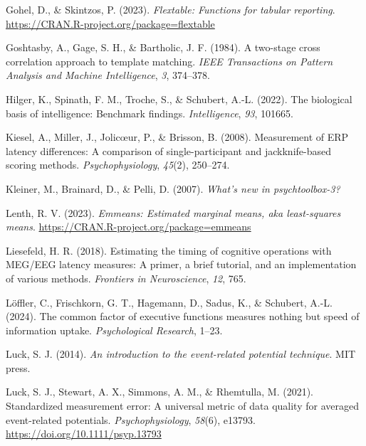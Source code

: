 \documentclass[
  man]{apa7}
\newlength{\cslhangindent}
\newlength{\cslentryspacingunit} %
\newenvironment{CSLReferences}[2] %
 {%
  \setlength{\parindent}{0pt}
  \ifodd #1
  \let\oldpar\par
  \def\par{\hangindent=\cslhangindent\oldpar}
  \fi
  \setlength{\parskip}{#2\cslentryspacingunit}
 }%
 {}
\begin{document}
\begin{CSLReferences}{1}{0}
\leavevmode{}%
Gohel, D., \& Skintzos, P. (2023). \emph{Flextable: Functions for tabular reporting}. \url{https://CRAN.R-project.org/package=flextable}

\leavevmode{}%
Goshtasby, A., Gage, S. H., \& Bartholic, J. F. (1984). A two-stage cross correlation approach to template matching. \emph{IEEE Transactions on Pattern Analysis and Machine Intelligence}, \emph{3}, 374--378.

\leavevmode{}%
Hilger, K., Spinath, F. M., Troche, S., \& Schubert, A.-L. (2022). The biological basis of intelligence: {Benchmark} findings. \emph{Intelligence}, \emph{93}, 101665.

\leavevmode{}%
Kiesel, A., Miller, J., Jolicœur, P., \& Brisson, B. (2008). Measurement of {ERP} latency differences: {A} comparison of single-participant and jackknife-based scoring methods. \emph{Psychophysiology}, \emph{45}(2), 250--274.

\leavevmode{}%
Kleiner, M., Brainard, D., \& Pelli, D. (2007). \emph{What's new in psychtoolbox-3?}

\leavevmode{}%
Lenth, R. V. (2023). \emph{Emmeans: Estimated marginal means, aka least-squares means}. \url{https://CRAN.R-project.org/package=emmeans}

\leavevmode{}%
Liesefeld, H. R. (2018). Estimating the timing of cognitive operations with {MEG}/{EEG} latency measures: A primer, a brief tutorial, and an implementation of various methods. \emph{Frontiers in Neuroscience}, \emph{12}, 765.

\leavevmode{}%
Löffler, C., Frischkorn, G. T., Hagemann, D., Sadus, K., \& Schubert, A.-L. (2024). The common factor of executive functions measures nothing but speed of information uptake. \emph{Psychological Research}, 1--23.

\leavevmode{}%
Luck, S. J. (2014). \emph{An introduction to the event-related potential technique}. MIT press.

\leavevmode{}%
Luck, S. J., Stewart, A. X., Simmons, A. M., \& Rhemtulla, M. (2021). Standardized measurement error: {A} universal metric of data quality for averaged event-related potentials. \emph{Psychophysiology}, \emph{58}(6), e13793. \url{https://doi.org/10.1111/psyp.13793}


\end{CSLReferences}
\end{document}

